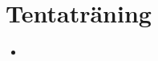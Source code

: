 \chapter{Tentaträning}\label{chapter:W14}
\begin{multicols}{2}\begin{itemize}[nosep,label={$\square$}]
\item\end{itemize}\end{multicols}
